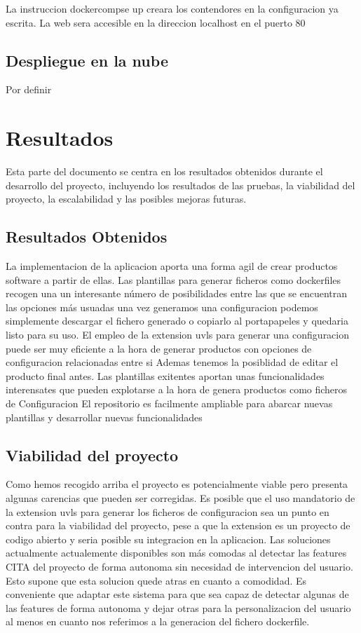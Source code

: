 \documentclass[12pt, a4paper, twoside]{article}
\begin{document}
La instruccion dockercompse up creara los contendores en la configuracion ya escrita. La web sera accesible en la direccion localhost en el puerto 80

\subsection{ Despliegue en la nube }
Por definir 





\section{Resultados}
Esta parte del documento se centra en los resultados obtenidos durante el desarrollo del proyecto, incluyendo los resultados de las pruebas, la viabilidad del proyecto, la escalabilidad y las posibles mejoras futuras.
\subsection{Resultados Obtenidos}
La implementacion de la aplicacion aporta una forma agil de crear productos software a partir de ellas.
Las plantillas para generar ficheros como dockerfiles recogen una un interesante número de posibilidades entre las que se encuentran las opciones más usuadas
una vez generamos una configuracion podemos simplemente descargar el fichero generado o copiarlo al portapapeles y quedaria listo para su uso.
El empleo de la extension uvls para generar una configuracion puede ser muy eficiente a la hora de generar productos con opciones de configuracion relacionadas entre si
Ademas tenemos la posiblidad de editar el producto final antes.
Las plantillas exitentes aportan unas funcionalidades interensates que pueden explotarse a la hora de genera productos como ficheros de Configuracion
El repositorio es facilmente ampliable para abarcar nuevas plantillas y desarrollar nuevas funcionalidades
\subsection{Viabilidad del proyecto}
Como hemos recogido arriba el proyecto es potencialmente viable pero presenta algunas carencias que pueden ser corregidas.
Es posible que el uso mandatorio de la extension uvls para generar los ficheros de configuracion sea un punto en contra para la viabilidad del proyecto, pese a que la extension es un proyecto de codigo abierto y seria posible su integracion en la aplicacion.
Las soluciones actualmente actualemente disponibles son más comodas al detectar las features CITA del proyecto de forma autonoma sin necesidad de intervencion del usuario. Esto supone que esta solucion quede atras en cuanto a comodidad. Es conveniente que adaptar este sistema 
para que sea capaz de detectar algunas de las features de forma autonoma y dejar otras para la personalizacion del usuario al menos en cuanto nos referimos a la generacion del fichero dockerfile.
\end{document}
